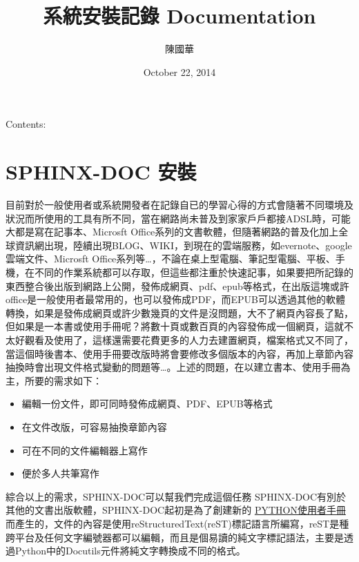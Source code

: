 \documentclass[letterpaper,10pt,english]{sphinxmanual}
\title{系統安裝記錄 Documentation}
\date{October 22, 2014}
\author{陳國華}
\begin{document}
\maketitle
\tableofcontents
{}\label{index::doc}


Contents:


\chapter{SPHINX-DOC 安裝}
\label{_doc/sphinx-doc/index:sphinx-doc}\label{_doc/sphinx-doc/index::doc}\label{_doc/sphinx-doc/index:welcome-to-s-documentation}
目前對於一般使用者或系統開發者在記錄自已的學習心得的方式會隨著不同環境及狀況而所使用的工具有所不同，當在網路尚未普及到家家戶戶都接ADSL時，可能大都是寫在記事本、Microsft Office系列的文書軟體，但隨著網路的普及化加上全球資訊網出現，陸續出現BLOG、WIKI，到現在的雲端服務，如evernote、google雲端文件、Microsft Office系列等…，不論在桌上型電腦、筆記型電腦、平板、手機，在不同的作業系統都可以存取，但這些都注重於快速記事，如果要把所記錄的東西整合後出版到網路上公開，發佈成網頁、pdf、epub等格式，在出版這塊或許office是一般使用者最常用的，也可以發佈成PDF，而EPUB可以透過其他的軟體轉換，如果是發佈成網頁或許少數幾頁的文件是沒問題，大不了網頁內容長了點，但如果是一本書或使用手冊呢？將數十頁或數百頁的內容發佈成一個網頁，這就不太好觀看及使用了，這樣還需要花費更多的人力去建置網頁，檔案格式又不同了，當這個時後書本、使用手冊要改版時將會要修改多個版本的內容，再加上章節內容抽換時會出現文件格式變動的問題等…。上述的問題，在以建立書本、使用手冊為主，所要的需求如下：
\begin{itemize}
\item {} 
編輯一份文件，即可同時發佈成網頁、PDF、EPUB等格式

\item {} 
在文件改版，可容易抽換章節內容

\item {} 
可在不同的文件編輯器上寫作

\item {} 
便於多人共筆寫作

\end{itemize}

綜合以上的需求，SPHINX-DOC可以幫我們完成這個任務
SPHINX-DOC有別於其他的文書出版軟體，SPHINX-DOC起初是為了創建新的 \href{https://doc.python.org/3.5/index.html}{PYTHON使用者手冊} 而產生的，文件的內容是使用reStructuredText(reST)標記語言所編寫，reST是種跨平台及任何文字編號器都可以編輯，而且是個易讀的純文字標記語法，主要是透過Python中的Docutils元件將純文字轉換成不同的格式。
\end{document}
